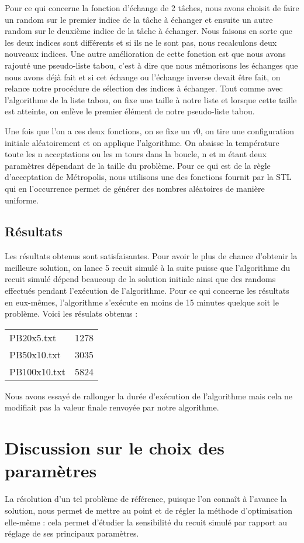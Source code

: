 \documentclass{report}
\begin{document}
Pour ce qui concerne la fonction d'échange de 2 tâches, nous avons choisit de faire un random sur le premier indice de la tâche à échanger et ensuite un autre random sur le deuxième indice de la tâche à échanger. Nous faisons en sorte que les deux indices sont différents et si ils ne le sont pas, nous recalculons deux nouveaux indices. Une autre amélioration de cette fonction est que nous avons rajouté une pseudo-liste tabou, c'est à dire que nous mémorisons les échanges que nous avons déjà fait et si cet échange ou l'échange inverse devait être fait, on relance notre procédure de sélection des indices à échanger. Tout comme avec l'algorithme de la liste tabou, on fixe une taille à notre liste et lorsque cette taille est atteinte, on enlève le premier élément de notre pseudo-liste tabou.

Une fois que l'on a ces deux fonctions, on se fixe un $\tau 0$, on tire une configuration initiale aléatoirement et on applique l'algorithme. On abaisse la température toute les n acceptations ou les m tours dans la boucle, n et m étant deux paramètres dépendant de la taille du problème. Pour ce qui est de la règle d'acceptation de Métropolis, nous utilisons une des fonctions fournit par la STL qui en l'occurrence permet de générer des nombres aléatoires de manière uniforme.

\subsection{Résultats}
Les résultats obtenus sont satisfaisantes. Pour avoir le plus de chance d'obtenir la meilleure solution, on lance 5 recuit simulé à la suite puisse que l'algorithme du recuit simulé dépend beaucoup de la solution initiale ainsi que des randoms effectués pendant l'exécution de l'algorithme. Pour ce qui concerne les résultats en eux-mêmes, l'algorithme s'exécute en moins de 15 minutes quelque soit le problème. Voici les résulats obtenus :\\
\begin{tabular}{ll}
	PB20x5.txt & 1278 \\
	PB50x10.txt & 3035 \\
	PB100x10.txt & 5824 \\
\end{tabular}

Nous avons essayé de rallonger la durée d'exécution de l'algorithme mais cela ne modifiait pas la valeur finale renvoyée par notre algorithme.


\section{Discussion sur le choix des paramètres}
La résolution d'un tel problème de référence, puisque l'on connaît à l'avance la solution, nous permet de mettre au point et de régler la méthode d'optimisation elle-même : cela permet d'étudier la sensibilité du recuit simulé par rapport au réglage de ses principaux paramètres.
\end{document}
